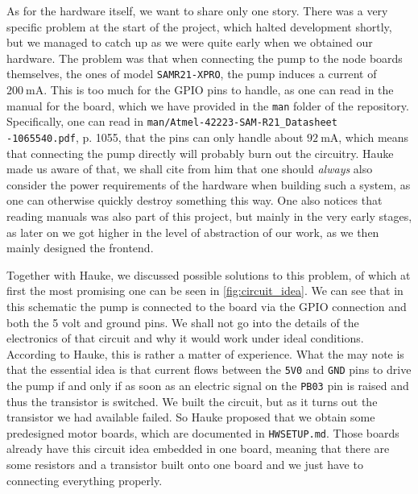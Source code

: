 \documentclass[acmtog, language=english, nonacm]{acmart}
\begin{document}
    As for the hardware itself, we want to share only one story. There was a very specific problem at the start of the project, which halted development shortly, but we managed to catch up as we were quite early when we obtained our hardware. The problem was that when connecting the pump to the node boards themselves, the ones of model \texttt{SAMR21-XPRO}, the pump induces a current of \(\qty{200}{\milli\ampere}\). This is too much for the GPIO pins to handle, as one can read in the manual for the board, which we have provided in the \texttt{man} folder of the repository. Specifically, one can read in \texttt{man/Atmel-42223-SAM-R21\_Datasheet\\-1065540.pdf}, p. 1055, that the pins can only handle about \(\qty{92}{\milli\ampere}\), which means that connecting the pump directly will probably burn out the circuitry. Hauke made us aware of that, we shall cite from him that one should \emph{always} also consider the power requirements of the hardware when building such a system, as one can otherwise quickly destroy something this way. One also notices that reading manuals was also part of this project, but mainly in the very early stages, as later on we got higher in the level of abstraction of our work, as we then mainly designed the frontend.

    Together with Hauke, we discussed possible solutions to this problem, of which at first the most promising one can be seen in \cref{fig:circuit_idea}. We can see that in this schematic the pump is connected to the board via the GPIO connection and both the 5 volt and ground pins. We shall not go into the details of the electronics of that circuit and why it would work under ideal conditions. According to Hauke, this is rather a matter of experience. What the may note is that the essential idea is that current flows between the \texttt{5V0} and \texttt{GND} pins to drive the pump if and only if as soon as an electric signal on the \texttt{PB03} pin is raised and thus the transistor is switched. We built the circuit, but as it turns out the transistor we had available failed. So Hauke proposed that we obtain some predesigned motor boards, which are documented in \texttt{HWSETUP.md}. Those boards already have this circuit idea embedded in one board, meaning that there are some resistors and a transistor built onto one board and we just have to connecting everything properly.
\end{document}
